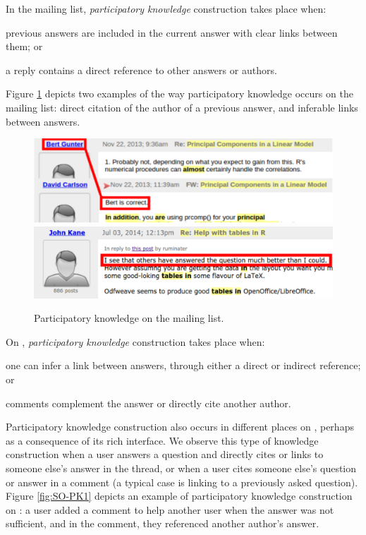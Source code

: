 In the \RH mailing list, \textit{participatory knowledge} construction takes place when:
\begin{enumerate*}[label=(\arabic*)]
  \item previous answers are included in the current answer with clear links between them; or
  \item a reply contains a direct reference to other answers or authors.
\end{enumerate*}
Figure \ref{fig:ML-PK1} depicts two examples of the way participatory knowledge occurs on the \RH mailing list: direct citation of the author of a previous answer, and inferable links between answers.

    
    \begin{figure}[!htb]
        \centering
        \includegraphics[width=\columnwidth]{Figures/ML-PKimg2}
        \includegraphics[width=\columnwidth]{Figures/ML-PKimg11}
        \caption[Participatory knowledge on the \RH mailing list.]{Participatory knowledge on the \RH mailing list.}
        \label{fig:ML-PK1}
      \vspace{-3mm}
    \end{figure}

On \SO, \textit{participatory knowledge} construction takes place when:
    \begin{enumerate*}[label=(\arabic*)]
    \item one can infer a link between answers, through either a direct or indirect reference; or
    \item comments complement the answer or directly cite another author.
    \end{enumerate*}
Participatory knowledge construction also occurs in different places on \SO, perhaps as a consequence of its rich interface. We observe this type of knowledge construction when a user answers a question and directly cites or links to someone else's answer in the thread, or when a user cites someone else's question or answer in a comment (a typical case is linking to a previously asked question). Figure \ref{fig:SO-PK1} depicts an example of participatory knowledge construction on \SO: a user added a comment to help another user when the answer was not sufficient, and in the comment, they referenced another author's answer.

